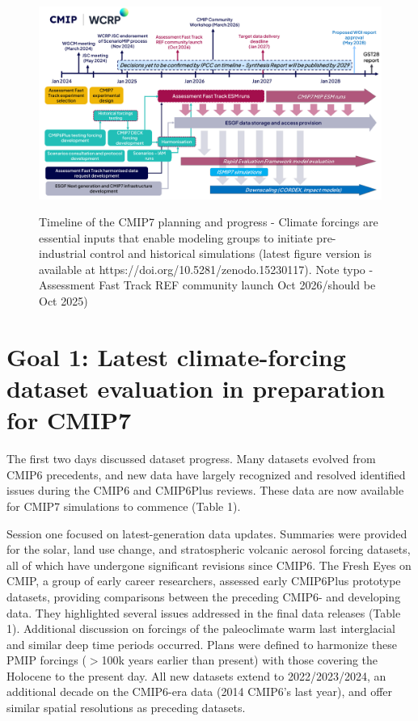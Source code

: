 \documentclass{ametsocV6.1}
\def\cred#1{{\color{red}#1}}
\begin{document}
\begin{figure}[t]
	 \noindent\includegraphics[width=\textwidth,angle=0]{250515_Fig1.pdf}\\
	 \caption{Timeline of the CMIP7 planning and progress - Climate forcings are essential inputs that enable modeling groups to initiate pre-industrial control and historical simulations (latest figure version is available at https://doi.org/10.5281/zenodo.15230117). \cred{Note typo - Assessment Fast Track REF community launch Oct 2026/should be Oct 2025)}}
	 \label{fig:f1}
\end{figure}


\section*{Goal 1: Latest climate-forcing dataset evaluation in preparation for CMIP7}
The first two days discussed dataset progress. Many datasets evolved from CMIP6 precedents, and new data have largely recognized and resolved identified issues during the CMIP6 and CMIP6Plus reviews. These data are now available for CMIP7 simulations to commence (Table 1).

Session one focused on latest-generation data updates. Summaries were provided for the solar, land use change, and stratospheric volcanic aerosol forcing datasets, all of which have undergone significant revisions since CMIP6. The Fresh Eyes on CMIP, a group of early career researchers, assessed early CMIP6Plus prototype datasets, providing comparisons between the preceding CMIP6- and developing data. They highlighted several issues addressed in the final data releases (Table 1). Additional discussion on forcings of the paleoclimate warm last interglacial and similar deep time periods occurred. Plans were defined to harmonize these PMIP forcings ($>$100k years earlier than present) with those covering the Holocene to the present day. All new datasets extend to 2022/2023/2024, an additional decade on the CMIP6-era data (2014 CMIP6’s last year), and offer similar spatial resolutions as preceding datasets.
\end{document}
